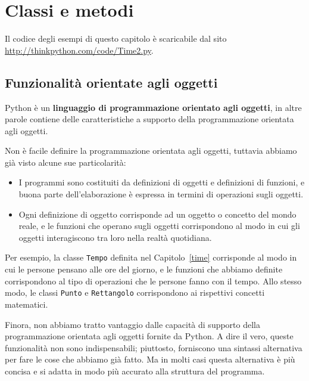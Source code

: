 \documentclass[10pt]{book}
\begin{document}
\chapter{Classi e metodi}

Il codice degli esempi di questo capitolo è scaricabile dal sito
\url{http://thinkpython.com/code/Time2.py}.

\section{Funzionalità orientate agli oggetti}

Python è un {\bf linguaggio di programmazione orientato agli oggetti}, in altre parole contiene delle caratteristiche a supporto della programmazione orientata agli oggetti.

Non è facile definire la programmazione orientata agli oggetti, tuttavia abbiamo già visto alcune sue particolarità:

\begin{itemize}

\item I programmi sono costituiti da definizioni di oggetti e definizioni di funzioni, e buona parte dell'elaborazione è espressa in termini di operazioni sugli oggetti.

\item Ogni definizione di oggetto corrisponde ad un oggetto o concetto del mondo reale, e le funzioni che operano sugli oggetti corrispondono al modo in cui gli oggetti interagiscono tra loro nella realtà quotidiana.

\end{itemize}

Per esempio, la classe {\tt Tempo} definita nel Capitolo~\ref{time}
corrisponde al modo in cui le persone pensano alle ore del giorno, e le funzioni che abbiamo definite corrispondono al tipo di operazioni che le persone fanno con il tempo. Allo stesso modo, le classi {\tt Punto} e {\tt Rettangolo} corrispondono ai rispettivi concetti matematici.

Finora, non abbiamo tratto vantaggio dalle capacità di supporto della   programmazione orientata agli oggetti fornite da Python. A dire il vero, queste funzionalità non sono indispensabili; piuttosto, forniscono una sintassi alternativa per fare le cose che abbiamo già fatto. Ma in molti casi questa alternativa è più concisa e si adatta in modo più accurato alla struttura del programma.
\end{document}
